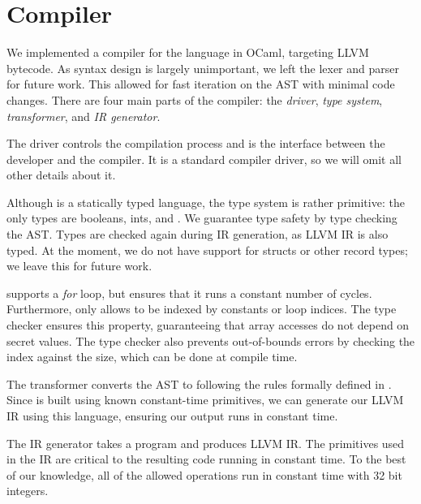 \section{Compiler}
\label{sec:implementation}

We implemented a compiler for the \constc language in OCaml, targeting LLVM bytecode. As syntax design is largely unimportant, we left the lexer and parser for future work. This allowed for fast iteration on the AST with minimal code changes. There are four main parts of the \constc compiler: the \textit{driver}, \textit{type system}, \textit{transformer}, and \textit{IR generator}.

 The driver controls the compilation process and is the interface between the developer and the compiler. It is a standard compiler driver, so we will omit all other details about it.

 Although \constc is a statically typed language, the type system is rather primitive: the only types are booleans, ints, and \bytearrays. We guarantee type safety by type checking the \constc AST. Types are checked again during IR generation, as LLVM IR is also typed. At the moment, we do not have support for structs or other record types; we leave this for future work.

\constc supports a \textit{for} loop, but ensures that it runs a constant number of cycles. Furthermore, \constc only allows \bytearrays to be indexed by constants or loop indices. The type checker ensures this property, guaranteeing that array accesses do not depend on secret values. The type checker also prevents out-of-bounds errors by checking the index against the \bytearray size, which can be done at compile time.

 The transformer converts the \constc AST to \ccore following the rules formally defined in . Since \ccore is built using known constant-time primitives, we can generate our LLVM IR using this language, ensuring our output runs in constant time.

 The IR generator takes a \ccore program and produces LLVM IR. The primitives used in the IR are critical to the resulting code running in constant time. To the best of our knowledge, all of the allowed operations run in constant time with 32 bit integers.

